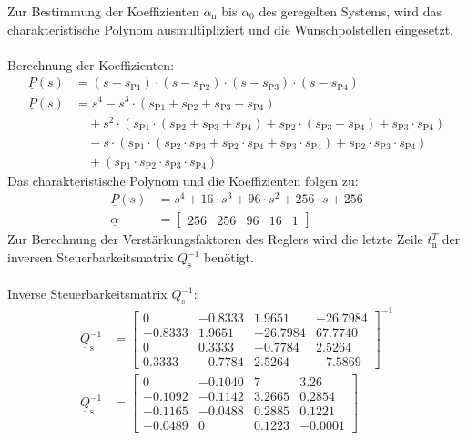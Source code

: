 Zur Bestimmung der Koeffizienten $\alpha_{\mathrm{n}}$ bis $\alpha_{\mathrm{0}}$ des geregelten Systems, wird das charakteristische Polynom ausmultipliziert und die Wunschpolstellen eingesetzt.\\\\
Berechnung der Koeffizienten:
\begin{align*}
    \underline{P}(s) &= (s-s_{\mathrm{P1}})\cdot(s-s_{\mathrm{P2}})\cdot(s-s_{\mathrm{P3}})\cdot(s-s_{\mathrm{P4}}) \\
    \underline{P}(s) &= s^4-s^3\cdot(s_{\mathrm{P1}}+s_{\mathrm{P2}}+s_{\mathrm{P3}}+s_{\mathrm{P4}}) \nonumber \\ 
    &\quad +s^2\cdot(s_{\mathrm{P1}}\cdot(s_{\mathrm{P2}}+s_{\mathrm{P3}}+s_{\mathrm{P4}})+s_{\mathrm{P2}}\cdot(s_{\mathrm{P3}}+s_{\mathrm{P4}})+s_{\mathrm{P3}}\cdot s_{\mathrm{P4}}) \nonumber \\
    &\quad -s\cdot(s_{\mathrm{P1}}\cdot(s_{\mathrm{P2}}\cdot s_{\mathrm{P3}}+s_{\mathrm{P2}}\cdot s_{\mathrm{P4}}+s_{\mathrm{P3}}\cdot s_{\mathrm{P4}})+s_{\mathrm{P2}}\cdot s_{\mathrm{P3}}\cdot s_{\mathrm{P4}}) \nonumber \\
    &\quad +(s_{\mathrm{P1}}\cdot s_{\mathrm{P2}}\cdot s_{\mathrm{P3}}\cdot s_{\mathrm{P4}})
\end{align*}
\newline
Das charakteristische Polynom und die Koeffizienten folgen zu:
\begin{align}
    \underline{P}(s) &= s^4+16\cdot s^3+96\cdot s^2+256\cdot s+256 \nonumber \\
    \underline{\alpha} &=
    \begin{bmatrix}
        256 & 256 & 96 & 16 & 1
    \end{bmatrix} \label{eq:Gleichung38}
\end{align}
\newline
Zur Berechnung der Verstärkungsfaktoren des Reglers wird die letzte Zeile $t_{\mathrm{n}}^T$ der inversen Steuerbarkeitsmatrix $Q_{\mathrm{s}}^{-1}$ benötigt.\\\\
Inverse Steuerbarkeitsmatrix $Q_{\mathrm{s}}^{-1}$:
\begin{align*}
    \underline{Q}_{\mathrm{s}}^{-1} &=
    \begin{bmatrix}
         0 & -0.8333 & 1.9651 & -26.7984 \\
        -0.8333 & 1.9651 & -26.7984 & 67.7740 \\
        0 & 0.3333 & -0.7784 & 2.5264 \\
        0.3333 & -0.7784 & 2.5264 & -7.5869
    \end{bmatrix}^{-1} \\
    \underline{Q}_{\mathrm{s}}^{-1} &=
    \begin{bmatrix}
        0 & -0.1040 & 7 & 3.26 \\
        -0.1092 & -0.1142 & 3.2665 & 0.2854 \\
        -0.1165 & -0.0488 & 0.2885 & 0.1221 \\
        -0.0489 & 0 & 0.1223 & -0.0001
    \end{bmatrix}
\end{align*}
